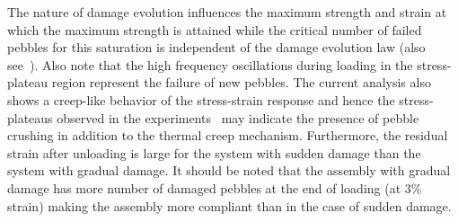 The nature of damage evolution influences the maximum strength and strain at which the maximum strength is attained while the critical number of failed pebbles for this saturation is independent of the damage evolution law (also see~\cite{Zhao2010}). Also note that the high frequency oscillations during loading in the stress-plateau region represent the failure of new pebbles. The current analysis also shows a creep-like behavior of the stress-strain response and hence the stress-plateaus observed in the experiments~\cite{Reimann:2000tw} may indicate the presence of pebble crushing in addition to the thermal creep mechanism. Furthermore, the residual strain after unloading is large for the system with sudden damage than the system with gradual damage. It should be noted that the assembly with gradual damage has more number of damaged pebbles at the end of loading (at 3\% strain) making the assembly more compliant than in the case of sudden damage. 









%
%
